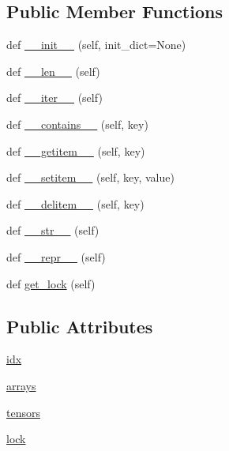 \subsection*{Public Member Functions}
\begin{DoxyCompactItemize}
\item 
def \hyperlink{classparlai_1_1utils_1_1thread_1_1SharedTable_a52b58b8d6ad0ba31cf2e3236afe970a5}{\+\_\+\+\_\+init\+\_\+\+\_\+} (self, init\+\_\+dict=None)
\item 
def \hyperlink{classparlai_1_1utils_1_1thread_1_1SharedTable_a6b6c4f7fb5887de4e2c82b0c11b6d680}{\+\_\+\+\_\+len\+\_\+\+\_\+} (self)
\item 
def \hyperlink{classparlai_1_1utils_1_1thread_1_1SharedTable_a6c386b5fba3bd7ff0715c808decbaa54}{\+\_\+\+\_\+iter\+\_\+\+\_\+} (self)
\item 
def \hyperlink{classparlai_1_1utils_1_1thread_1_1SharedTable_afac82c3717ad0344c5bdfc7b8913d796}{\+\_\+\+\_\+contains\+\_\+\+\_\+} (self, key)
\item 
def \hyperlink{classparlai_1_1utils_1_1thread_1_1SharedTable_a624b898ff3294a8be69ad796640cc7ee}{\+\_\+\+\_\+getitem\+\_\+\+\_\+} (self, key)
\item 
def \hyperlink{classparlai_1_1utils_1_1thread_1_1SharedTable_a43bc2c55c2125ce9c4848933fadeef5c}{\+\_\+\+\_\+setitem\+\_\+\+\_\+} (self, key, value)
\item 
def \hyperlink{classparlai_1_1utils_1_1thread_1_1SharedTable_a567947ad20bdc1ad18815fc1883ea247}{\+\_\+\+\_\+delitem\+\_\+\+\_\+} (self, key)
\item 
def \hyperlink{classparlai_1_1utils_1_1thread_1_1SharedTable_aa18f723bbdfce0ab50d9c36b20cec2c7}{\+\_\+\+\_\+str\+\_\+\+\_\+} (self)
\item 
def \hyperlink{classparlai_1_1utils_1_1thread_1_1SharedTable_af4577c8c954666ac3905a6215835bbd0}{\+\_\+\+\_\+repr\+\_\+\+\_\+} (self)
\item 
def \hyperlink{classparlai_1_1utils_1_1thread_1_1SharedTable_ab9acef58b28d0c992c841a4cc11a5df2}{get\+\_\+lock} (self)
\end{DoxyCompactItemize}
\subsection*{Public Attributes}
\begin{DoxyCompactItemize}
\item 
\hyperlink{classparlai_1_1utils_1_1thread_1_1SharedTable_aec0fa85ca2544dd6220db34c7da01a08}{idx}
\item 
\hyperlink{classparlai_1_1utils_1_1thread_1_1SharedTable_a722e0cb6428af2282f4a2697c2c86d01}{arrays}
\item 
\hyperlink{classparlai_1_1utils_1_1thread_1_1SharedTable_ad1a6839c09b909c73c7b57ece300d4d4}{tensors}
\item 
\hyperlink{classparlai_1_1utils_1_1thread_1_1SharedTable_aa9c342b24e24a93c40950671a326d014}{lock}
\end{DoxyCompactItemize}
